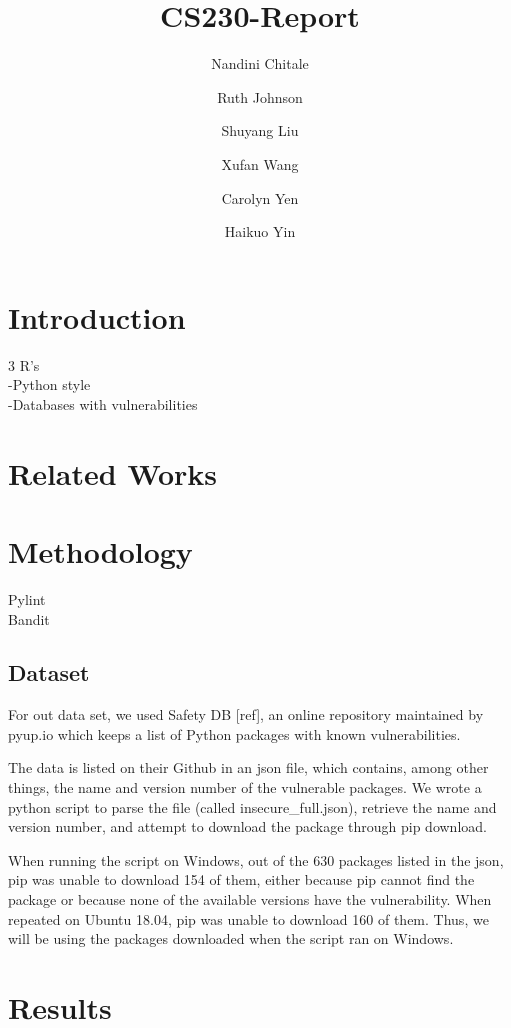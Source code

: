 \documentclass[acmlarge]{acmart}
\title{CS230-Report}
\author{Nandini Chitale}
\author{Ruth Johnson}
\author{Shuyang Liu}
\author{Xufan Wang}
\author{Carolyn Yen}
\author{Haikuo Yin}
\begin{document}
\maketitle

\begin{abstract}
      
\end{abstract}
\section{Introduction}
3 R's\\
-Python style\\
-Databases with vulnerabilities\\
\section{Related Works}

\section{Methodology}
Pylint\\
Bandit\\
\subsection{Dataset}
For out data set, we used Safety DB [ref], an online repository maintained by pyup.io which keeps a list of Python packages with known vulnerabilities. 

The data is listed on their Github in an json file, which contains, among other things, the name and version number of the vulnerable packages. We wrote a python script to parse the file (called insecure\_full.json), retrieve the name and version number, and attempt to download the package through pip download.

When running the script on Windows, out of the 630 packages listed in the json, pip was unable to download 154 of them, either because pip cannot find the package or because none of the available versions have the vulnerability. When repeated on Ubuntu 18.04, pip was unable to download 160 of them. Thus, we will be using the packages downloaded when the script ran on Windows.

\section{Results}
\end{document}
